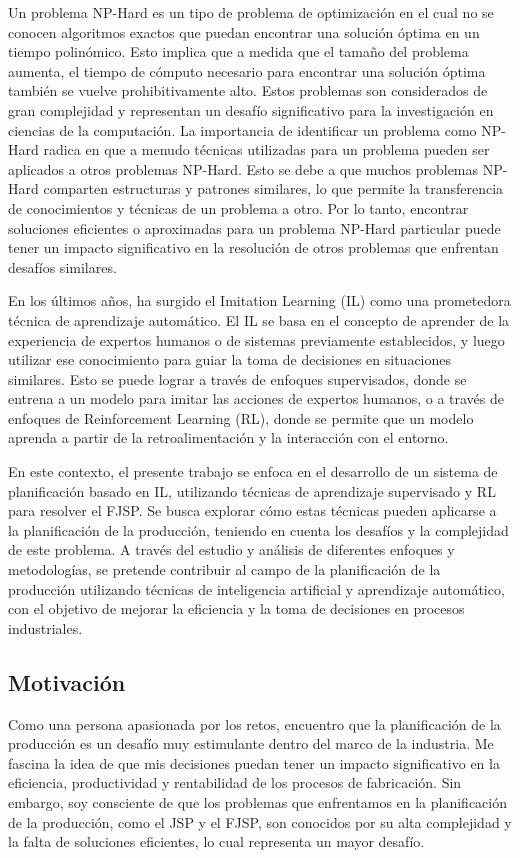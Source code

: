 Un problema NP-Hard es un tipo de problema de optimización en el cual no se conocen algoritmos 
exactos que puedan encontrar una solución óptima en un tiempo polinómico. Esto implica que a 
medida que el tamaño del problema aumenta, el tiempo de cómputo necesario para encontrar una 
solución óptima también se vuelve prohibitivamente alto. Estos problemas son considerados de 
gran complejidad y representan un desafío significativo para la investigación en ciencias de 
la computación. La importancia de identificar un problema como NP-Hard radica en que a menudo 
técnicas utilizadas para un problema pueden ser aplicados a otros problemas NP-Hard. Esto se debe a que 
muchos problemas NP-Hard comparten estructuras y patrones similares, lo que permite la 
transferencia de conocimientos y técnicas de un problema a otro. Por lo tanto, encontrar 
soluciones eficientes o aproximadas para un problema NP-Hard particular puede tener un impacto 
significativo en la resolución de otros problemas que enfrentan desafíos similares.\medskip

En los últimos años, ha surgido el Imitation Learning (IL) \cite{SmartLab_2019} como una 
prometedora técnica de aprendizaje automático. El IL se basa en el concepto de aprender 
de la experiencia de expertos humanos o de sistemas previamente establecidos, y luego utilizar 
ese conocimiento para guiar la toma de decisiones en situaciones similares. Esto se puede lograr 
a través de enfoques supervisados, donde se entrena a un modelo para imitar las acciones de 
expertos humanos, o a través de enfoques de Reinforcement Learning (RL)\cite{Bhatt_2018}, 
donde se permite que un modelo aprenda a partir de la retroalimentación y la interacción 
con el entorno.\medskip

En este contexto, el presente trabajo se enfoca en el desarrollo de un sistema de planificación 
basado en IL, utilizando técnicas de aprendizaje supervisado y RL para resolver el FJSP. 
Se busca explorar cómo estas técnicas pueden aplicarse a la planificación de la producción, teniendo 
en cuenta los desafíos y la complejidad de este problema. A través del estudio y análisis de 
diferentes enfoques y metodologías, se pretende contribuir al campo de la planificación de la 
producción utilizando técnicas de inteligencia artificial y aprendizaje automático, con el objetivo 
de mejorar la eficiencia y la toma de decisiones en procesos industriales.

\subsection{Motivación}
Como una persona apasionada por los retos, encuentro que la planificación de la producción es un desafío 
muy estimulante dentro del marco de la industria. Me fascina la idea de que mis decisiones puedan tener un 
impacto significativo en la eficiencia, productividad y rentabilidad de los procesos de fabricación. Sin embargo, 
soy consciente de que los problemas que enfrentamos en la planificación de la producción, como el JSP y el FJSP, 
son conocidos por su alta complejidad y la falta de soluciones eficientes, lo cual representa 
un mayor desafío.\medskip

